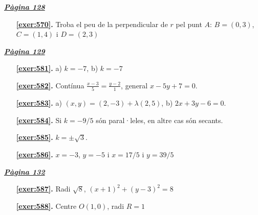 
\hyperlink{page.128}{\textbf{\em Pàgina 128}}
\begin{enumerate}
\item[\fontfamily{phv}\selectfont\color{blue}\textbf{\ref{exer:570}. }] \label{ans:570} 
Troba el peu de la perpendicular de $r$ pel punt $A$: $B=(0,3)$, $C=(1,4)$ i $D=(2,3)$ 
 \end{enumerate}
\vspace{0.3cm}


\hyperlink{page.129}{\textbf{\em Pàgina 129}}
\begin{enumerate}
\item[\fontfamily{phv}\selectfont\color{blue}\textbf{\ref{exer:581}. }] \label{ans:581} 
 a) $k=-7$, b) $k=-7$
 \end{enumerate}
\begin{enumerate}
\item[\fontfamily{phv}\selectfont\color{blue}\textbf{\ref{exer:582}. }] \label{ans:582} 
Contínua $\frac {x-3}{5}=\frac {y-2}{1}$, general $x-5y+7=0$.
\item[\fontfamily{phv}\selectfont\color{blue}\textbf{\ref{exer:583}. }] \label{ans:583} 
a) $(x,y)=(2,-3)+\lambda (2, 5)$, b) $2x+3y-6=0$.
\item[\fontfamily{phv}\selectfont\color{blue}\textbf{\ref{exer:584}. }] \label{ans:584} 
Si $k=-9/5$ són paral·leles, en altre cas són secants.
\item[\fontfamily{phv}\selectfont\color{blue}\textbf{\ref{exer:585}. }] \label{ans:585} 
$k=\pm \sqrt {3}$.
\item[\fontfamily{phv}\selectfont\color{blue}\textbf{\ref{exer:586}. }] \label{ans:586} 
$x=-3$, $y=-5$ i $x=17/5$ i $y=39/5$
 \end{enumerate}

 \vspace{1cm} 
 

\vspace{0.3cm}


\hyperlink{page.132}{\textbf{\em Pàgina 132}}
\begin{enumerate}
\item[\fontfamily{phv}\selectfont\color{blue}\textbf{\ref{exer:587}. }] \label{ans:587} 
Radi $\sqrt {8}$, $(x+1)^2+(y-3)^2=8$
 \end{enumerate}
\begin{enumerate}
\item[\fontfamily{phv}\selectfont\color{blue}\textbf{\ref{exer:588}. }] \label{ans:588} 
Centre $O(1,0)$, radi $R=1$
 \end{enumerate}
\vspace{0.3cm}


